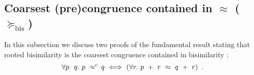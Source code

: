 
\subsection{Coarsest (pre)congruence contained in $\approx$ ($\succeq_{\mathrm{bis}}$)}
\label{s:coarsest}


In this subsection we discuss two proofs of the fundamental result stating that
rooted bisimilarity is the coarsest congruence contained in
bisimilarity \cite{van2005characterisation,Gorrieri:2015jt,Mil89}:
\begin{equation}
\label{eq:coarsest}
\forall p\ \ q.\ p\ \rapprox\ \! q\ \Longleftrightarrow\ ( \forall r.\ p\ +\
r\ \approx\ q\ +\ r )\enspace.
\end{equation}


